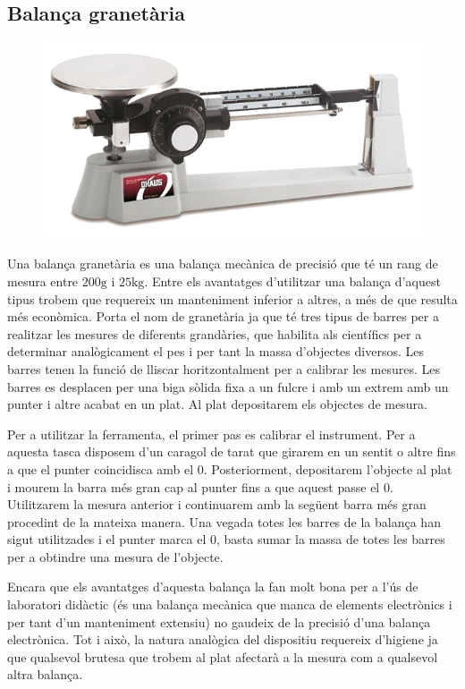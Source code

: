 \documentclass[11pt]{article}
\begin{document}
    \subsection{Balança granetària}\label{appendix:granetaria}
        \vspace{0.2cm}
            \begin{figure}
                \vspace{-0.85cm}
                \begin{center}
                    \includegraphics[width=.27\textwidth]{fotos/granataria.png}
                \end{center}
            \end{figure}
        Una balança granetària es una balança mecànica de precisió que té un rang de mesura entre $200\si{\gram}$ i $25\si{\kilogram}$. Entre els avantatges d'utilitzar una balança d'aquest tipus trobem que requereix un manteniment inferior a altres, a més de que resulta més econòmica. Porta el nom de granetària ja que té tres tipus de barres per a realitzar les mesures de diferents grandàries, que habilita als científics per a determinar analògicament el pes i per tant la massa d'objectes diversos. Les barres tenen la funció de lliscar horitzontalment per a calibrar les mesures. Les barres es desplacen per una biga sòlida fixa a un fulcre i amb un extrem amb un punter i altre acabat en un plat. Al plat depositarem els objectes de mesura.
    
        \vspace{0.5cm}Per a utilitzar la ferramenta, el primer pas es calibrar el instrument. Per a aquesta tasca disposem d'un caragol de tarat que girarem en un sentit o altre fins a que el punter coincidisca amb el 0. Posteriorment, depositarem l'objecte al plat i mourem la barra més gran cap al punter fins a que aquest passe el 0. Utilitzarem la mesura anterior i continuarem amb la següent barra més gran procedint de la mateixa manera. Una vegada totes les barres de la balança han sigut utilitzades i el punter marca el 0, basta sumar la massa de totes les barres per a obtindre una mesura de l'objecte.
    
        \vspace{0.5cm}Encara que els avantatges d'aquesta balança la fan molt bona per a l'ús de laboratori didàctic (és una balança mecànica que manca de elements electrònics i per tant d'un manteniment extensiu) no gaudeix de la precisió d'una balança electrònica. Tot i això, la natura analògica del dispositiu requereix d'higiene ja que qualsevol brutesa que trobem al plat afectarà a la mesura com a qualsevol altra balança.
\end{document}
